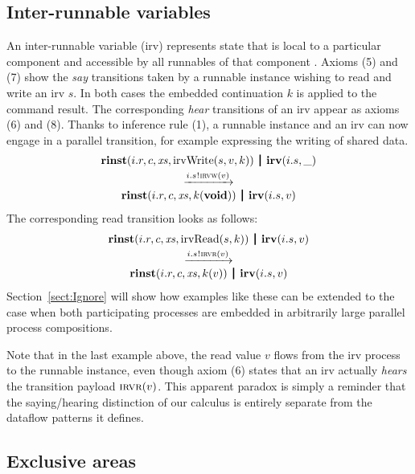 \documentclass[10pt,conference]{IEEEtran}
\begin{document}
\subsection{Inter-runnable variables}

An inter-runnable variable (irv) represents state that is local to a particular component and accessible by all runnables of that component \cite[ch.~4.3.3.1]{AR:RTE}. Axioms (5) and (7) show the \emph{say} transitions taken by a runnable instance wishing to read and write an irv $s$. In both cases the embedded continuation $k$ is applied to the command result. The corresponding \emph{hear} transitions of an irv appear as axioms (6) and (8). Thanks to inference rule (1), a runnable instance and an irv can now engage in a parallel transition, for example expressing the writing of shared data.
$$
\begin{array}{c}
  \Tpar {\Trinst {i.r} c \Xs {\TrteIrvWrite s v k}}
        {\Tirv {i.s} \_} \vspace{0.6ex} \\
  \red {\say {i.s} {\Tirvw v}} \\
  \Tpar {\Trinst {i.r} c \Xs {\Tap k \Tvoid}}
        {\Tirv {i.s} v}
\end{array}
$$
The corresponding read transition looks as follows:
$$
\begin{array}{c}
  \Tpar {\Trinst {i.r} c \Xs {\TrteIrvRead s k}}
        {\Tirv {i.s} v} \vspace{0.6ex} \\
  \red {\say {i.s} {\Tirvr v}} \\
  \Tpar {\Trinst {i.r} c \Xs {\Tap k v}}
        {\Tirv {i.s} v}
\end{array}
$$
Section~\ref{sect:Ignore} will show how examples like these can be extended to the case when both participating processes are embedded in arbitrarily large parallel process compositions.

Note that in the last example above, the read value $v$ flows from the irv process to the runnable instance, even though axiom (6) states that an irv actually \emph{hears} the transition payload $\textsc{irvr}(v)$. This apparent paradox is simply a reminder that the saying/hearing distinction of our calculus is entirely separate from the dataflow patterns it defines.


\subsection{Exclusive areas}
\end{document}
